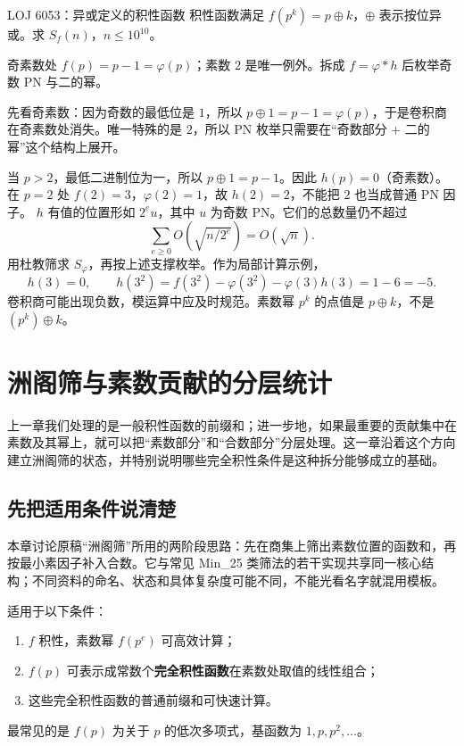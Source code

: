 \begin{problem}{LOJ 6053：异或定义的积性函数}
积性函数满足 $f(p^k)=p\mathbin{\oplus}k$，$\oplus$ 表示按位异或。求 $S_f(n)$，$n\le10^{10}$。
\end{problem}
\hint 奇素数处 $f(p)=p-1=\varphi(p)$；素数 $2$ 是唯一例外。拆成 $f=\varphi*h$ 后枚举奇数 PN 与二的幂。

\begin{pitfall}[讲解：先看这题到底在做什么]
先看奇素数：因为奇数的最低位是 $1$，所以 $p\oplus1=p-1=\varphi(p)$，于是卷积商在奇素数处消失。唯一特殊的是 $2$，所以 PN 枚举只需要在“奇数部分 + 二的幂”这个结构上展开。
\end{pitfall}

\sol 当 $p>2$，最低二进制位为一，所以 $p\oplus1=p-1$。因此 $h(p)=0$（奇素数）。在 $p=2$ 处 $f(2)=3$，$\varphi(2)=1$，故 $h(2)=2$，不能把 $2$ 也当成普通 PN 因子。
$h$ 有值的位置形如 $2^e u$，其中 $u$ 为奇数 PN。它们的总数量仍不超过
\[
 \sum_{e\ge0}O\!\left(\sqrt{n/2^e}\right)=O(\sqrt n).
\]
用杜教筛求 $S_\varphi$，再按上述支撑枚举。作为局部计算示例，
\[
 h(3)=0,\qquad h(3^2)=f(3^2)-\varphi(3^2)-\varphi(3)h(3)=1-6=-5.
\]
卷积商可能出现负数，模运算中应及时规范。素数幂 $p^k$ 的点值是 $p\oplus k$，不是 $(p^k)\oplus k$。



\chapter{洲阁筛与素数贡献的分层统计}
\begin{chapterintro}[章节导读]
上一章我们处理的是一般积性函数的前缀和；进一步地，如果最重要的贡献集中在素数及其幂上，就可以把“素数部分”和“合数部分”分层处理。这一章沿着这个方向建立洲阁筛的状态，并特别说明哪些完全积性条件是这种拆分能够成立的基础。
\end{chapterintro}

\section{先把适用条件说清楚}
本章讨论原稿“洲阁筛”所用的两阶段思路：先在商集上筛出素数位置的函数和，再按最小素因子补入合数。它与常见 Min\_25 类筛法的若干实现共享同一核心结构；不同资料的命名、状态和具体复杂度可能不同，不能光看名字就混用模板。

适用于以下条件：
\begin{enumerate}
\item $f$ 积性，素数幂 $f(p^e)$ 可高效计算；
\item $f(p)$ 可表示成常数个\textbf{完全积性函数}在素数处取值的线性组合；
\item 这些完全积性函数的普通前缀和可快速计算。
\end{enumerate}
最常见的是 $f(p)$ 为关于 $p$ 的低次多项式，基函数为 $1,p,p^2,\ldots$。

